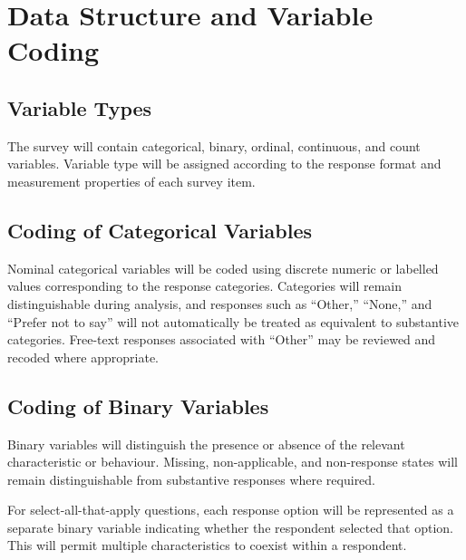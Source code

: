 \section{Data Structure and Variable Coding}

\subsection{Variable Types}

The survey will contain categorical, binary, ordinal, continuous, and count variables. Variable type will be assigned according to the response format and measurement properties of each survey item.


\subsection{Coding of Categorical Variables}

Nominal categorical variables will be coded using discrete numeric or labelled values corresponding to the response categories. Categories will remain distinguishable during analysis, and responses such as ``Other,'' ``None,'' and ``Prefer not to say'' will not automatically be treated as equivalent to substantive categories. Free-text responses associated with ``Other'' may be reviewed and recoded where appropriate.


\subsection{Coding of Binary Variables}

Binary variables will distinguish the presence or absence of the relevant characteristic or behaviour. Missing, non-applicable, and non-response states will remain distinguishable from substantive responses where required.

For select-all-that-apply questions, each response option will be represented as a separate binary variable indicating whether the respondent selected that option. This will permit multiple characteristics to coexist within a respondent.

